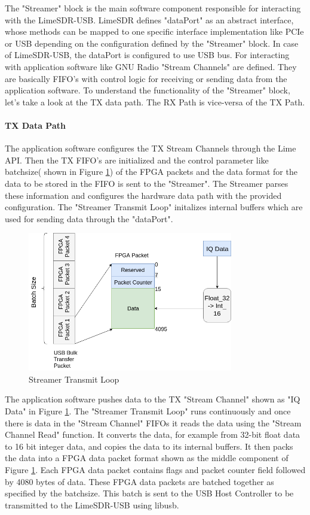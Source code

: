 The "Streamer" block is the main software component responsible for interacting with the LimeSDR-USB.
LimeSDR defines "dataPort" as an abstract interface, whose methods can be mapped to one specific interface implementation like \ac{PCIe} or USB depending on the configuration defined by the "Streamer" block.
In case of LimeSDR-USB, the dataPort is configured to use \ac{USB} bus.
For interacting with application software like GNU Radio "Stream Channels" are defined.
They are basically FIFO's with control logic for receiving or sending data from the application software.
To understand the functionality of the "Streamer" block, let's take a look at the TX data path.
The RX Path is vice-versa of the TX Path.\\

\paragraph{TX Data Path} \label{TX Data Path} The application software configures the TX Stream Channels through the Lime \ac{API}. 
Then the TX FIFO's are initialized and the control parameter like batchsize( shown in Figure \ref{trans_loop}) of the \ac{FPGA} packets and the data format for the data to be stored in the FIFO is sent to the "Streamer".
The Streamer parses these information and configures the hardware data path with the provided configuration.
The "Streamer Transmit Loop" initalizes internal buffers which are used for sending data through the "dataPort".\\
\begin{figure}[h!]
\centering
\includegraphics[width=0.8\textwidth]{Figure/DriverHost.png}
\caption{Streamer Transmit Loop}
\label{trans_loop}
\end{figure}
 
The application software pushes data to the TX "Stream Channel" shown as "IQ Data" in Figure \ref{trans_loop}.
The "Streamer Transmit Loop" runs continuously and once there is data in the "Stream Channel" FIFOs it reads the data using the "Stream Channel Read" function.
It converts the data, for example from 32-bit float data to 16 bit integer data, and copies the data to its internal buffers.
It then packs the data into a FPGA data packet format shown as the middle component of Figure \ref{trans_loop}.
Each \ac{FPGA} data packet contains flags and packet counter field followed by  4080 bytes of data.
These \ac{FPGA} data packets are batched together as specified by the batchsize.
This batch is sent to the USB Host Controller to be transmitted to the LimeSDR-USB using libusb.

